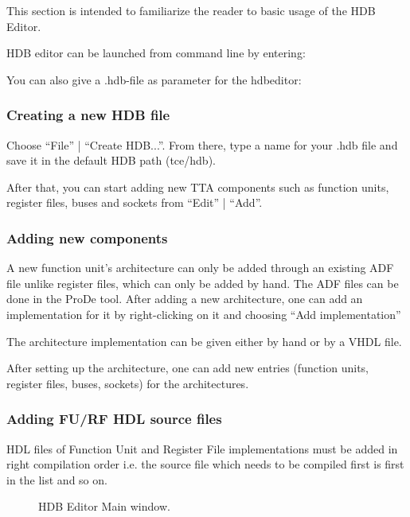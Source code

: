 \documentclass[a4paper,twoside]{tceusermanual}
\begin{document}
This section is intended to familiarize the reader to basic usage of the HDB
Editor.

HDB editor can be launched from command line by entering:


You can also give a .hdb-file as parameter for the hdbeditor:


\subsubsection{Creating a new HDB file}

Choose ``File'' | ``Create HDB...''. 
From there, type a name for your .hdb file and save it in the default HDB path
(tce/hdb).

After that, you can start adding new TTA components such as function units,
register files, buses and sockets from ``Edit'' | ``Add''.

\subsubsection{Adding new components}
A new function unit's architecture can only be added through an existing ADF
file unlike register files, which can only be added by hand. The ADF files
can be done in the ProDe tool. After adding a new architecture, one can add an
implementation for it by right-clicking on it and choosing ``Add
implementation''

The architecture implementation can be given either by hand or by a VHDL file.

After setting up the architecture, one can add new entries (function units,
register files, buses, sockets) for the architectures.

\subsubsection{Adding FU/RF HDL source files}
HDL files of Function Unit and Register File implementations must be added in
right compilation order i.e. the source file which needs to be compiled first
is first in the list and so on.

\begin{figure}[tb]
\centerline{}
\caption{HDB Editor Main window.}
\label{fig:hdbeditor_main_window}
\end{figure}
\end{document}
